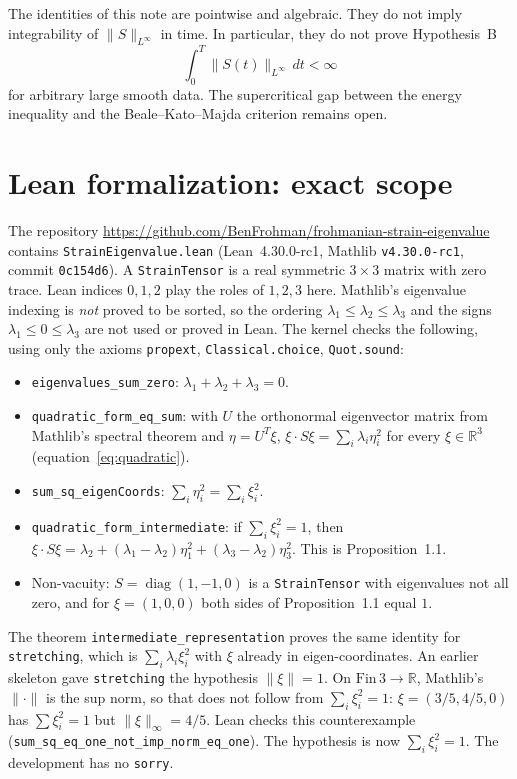 \documentclass[11pt,a4paper]{article}
\begin{document}
The identities of this note are pointwise and algebraic. They do not imply integrability of \(\|S\|_{L^\infty}\) in time. In particular, they do not prove Hypothesis~B
\[
\int_0^T\|S(t)\|_{L^\infty}\,dt<\infty
\]
for arbitrary large smooth data. The supercritical gap between the energy inequality and the Beale--Kato--Majda criterion remains open.


\section{Lean formalization: exact scope}\label{sec:lean}

The repository \url{https://github.com/BenFrohman/frohmanian-strain-eigenvalue} contains \texttt{StrainEigenvalue.lean} (Lean~4.30.0-rc1, Mathlib \texttt{v4.30.0-rc1}, commit \texttt{0c154d6}). A \texttt{StrainTensor} is a real symmetric \(3\times3\) matrix with zero trace. Lean indices \(0,1,2\) play the roles of \(1,2,3\) here. Mathlib's eigenvalue indexing is \emph{not} proved to be sorted, so the ordering \(\lambda_1\le\lambda_2\le\lambda_3\) and the signs \(\lambda_1\le0\le\lambda_3\) are not used or proved in Lean. The kernel checks the following, using only the axioms \texttt{propext}, \texttt{Classical.choice}, \texttt{Quot.sound}:
\begin{itemize}
\item \texttt{eigenvalues\_sum\_zero}: \(\lambda_1+\lambda_2+\lambda_3=0\).
\item \texttt{quadratic\_form\_eq\_sum}: with \(U\) the orthonormal eigenvector matrix from Mathlib's spectral theorem and \(\eta=U^{T}\xi\), \(\xi\cdot S\xi=\sum_i\lambda_i\eta_i^2\) for every \(\xi\in\mathbb{R}^3\) (equation~\eqref{eq:quadratic}).
\item \texttt{sum\_sq\_eigenCoords}: \(\sum_i\eta_i^2=\sum_i\xi_i^2\).
\item \texttt{quadratic\_form\_intermediate}: if \(\sum_i\xi_i^2=1\), then \(\xi\cdot S\xi=\lambda_2+(\lambda_1-\lambda_2)\eta_1^2+(\lambda_3-\lambda_2)\eta_3^2\). This is Proposition~1.1.
\item Non-vacuity: \(S=\operatorname{diag}(1,-1,0)\) is a \texttt{StrainTensor} with eigenvalues not all zero, and for \(\xi=(1,0,0)\) both sides of Proposition~1.1 equal \(1\).
\end{itemize}
The theorem \texttt{intermediate\_representation} proves the same identity for \texttt{stretching}, which is \(\sum_i\lambda_i\xi_i^2\) with \(\xi\) already in eigen-coordinates. An earlier skeleton gave \texttt{stretching} the hypothesis \(\|\xi\|=1\). On \(\mathrm{Fin}\,3\to\mathbb{R}\), Mathlib's \(\|\cdot\|\) is the sup norm, so that does not follow from \(\sum_i\xi_i^2=1\): \(\xi=(3/5,4/5,0)\) has \(\sum\xi_i^2=1\) but \(\|\xi\|_\infty=4/5\). Lean checks this counterexample (\texttt{sum\_sq\_eq\_one\_not\_imp\_norm\_eq\_one}). The hypothesis is now \(\sum_i\xi_i^2=1\). The development has no \texttt{sorry}.
\end{document}
